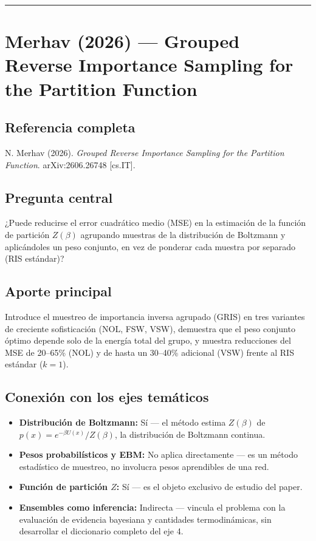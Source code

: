 \documentclass[12pt]{article}
\begin{document}
\bigskip
\hrule
\bigskip

\section{Merhav (2026) --- Grouped Reverse Importance Sampling for the Partition Function}

\subsection*{Referencia completa}
N. Merhav (2026). \textit{Grouped Reverse Importance Sampling for the Partition Function}.
arXiv:2606.26748 [cs.IT]. \cite{merhav2026}

\subsection*{Pregunta central}
¿Puede reducirse el error cuadrático medio (MSE) en la estimación de la función de partición
$Z(\beta)$ agrupando muestras de la distribución de Boltzmann y aplicándoles un peso conjunto,
en vez de ponderar cada muestra por separado (RIS estándar)?

\subsection*{Aporte principal}
Introduce el muestreo de importancia inversa agrupado (GRIS) en tres variantes de creciente
sofisticación (NOL, FSW, VSW), demuestra que el peso conjunto óptimo depende solo de la energía
total del grupo, y muestra reducciones del MSE de 20--65\% (NOL) y de hasta un 30--40\%
adicional (VSW) frente al RIS estándar ($k=1$).

\subsection*{Conexión con los ejes temáticos}
\begin{itemize}
  \item \textbf{Distribución de Boltzmann:} Sí --- el método estima $Z(\beta)$ de $p(x)=e^{-\beta U(x)}/Z(\beta)$, la distribución de Boltzmann continua.
  \item \textbf{Pesos probabilísticos y EBM:} No aplica directamente --- es un método estadístico de muestreo, no involucra pesos aprendibles de una red.
  \item \textbf{Función de partición $Z$:} Sí --- es el objeto exclusivo de estudio del paper.
  \item \textbf{Ensembles como inferencia:} Indirecta --- vincula el problema con la evaluación de evidencia bayesiana y cantidades termodinámicas, sin desarrollar el diccionario completo del eje 4.
\end{itemize}
\end{document}
